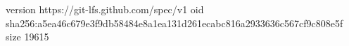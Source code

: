 version https://git-lfs.github.com/spec/v1
oid sha256:a5ea46c679e3f9db58484e8a1ea131d261ecabc816a2933636c567cf9c808e5f
size 19615
